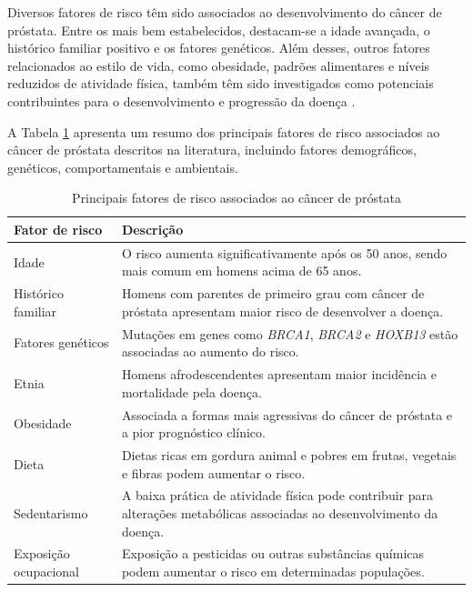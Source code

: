 Diversos fatores de risco têm sido associados ao desenvolvimento do câncer de próstata. Entre os mais bem estabelecidos, destacam-se a idade avançada, o histórico familiar positivo e os fatores genéticos. Além desses, outros fatores relacionados ao estilo de vida, como obesidade, padrões alimentares e níveis reduzidos de atividade física, também têm sido investigados como potenciais contribuintes para o desenvolvimento e progressão da doença \cite{bergengren2023update,perdana2016}. 

A Tabela \ref{tab:risk_factors_prostate} apresenta um resumo dos principais fatores de risco associados ao câncer de próstata descritos na literatura, incluindo fatores demográficos, genéticos, comportamentais e ambientais.

\begin{table}[h]
	\centering
	\caption{Principais fatores de risco associados ao câncer de próstata}
	\label{tab:risk_factors_prostate}
	\begin{tabular}{lp{10cm}}
		\hline
		\textbf{Fator de risco} & \textbf{Descrição} \\
		\hline
		
		Idade & O risco aumenta significativamente após os 50 anos, sendo mais comum em homens acima de 65 anos. \\
		
		\hline
		
		Histórico familiar & Homens com parentes de primeiro grau com câncer de próstata apresentam maior risco de desenvolver a doença. \\
		
		\hline
		
		Fatores genéticos & Mutações em genes como \textit{BRCA1}, \textit{BRCA2} e \textit{HOXB13} estão associadas ao aumento do risco. \\
		
		\hline
		
		Etnia & Homens afrodescendentes apresentam maior incidência e mortalidade pela doença. \\
		
		\hline
		
		Obesidade & Associada a formas mais agressivas do câncer de próstata e a pior prognóstico clínico. \\
		
		\hline
		
		Dieta & Dietas ricas em gordura animal e pobres em frutas, vegetais e fibras podem aumentar o risco. \\
		
		\hline
		
		Sedentarismo & A baixa prática de atividade física pode contribuir para alterações metabólicas associadas ao desenvolvimento da doença. \\
		
		\hline
		
		Exposição ocupacional & Exposição a pesticidas ou outras substâncias químicas podem aumentar o risco em determinadas populações. \\
		
		\hline
		
	\end{tabular}
\end{table}

